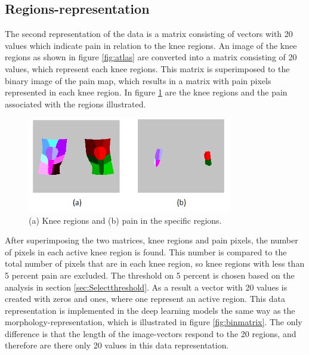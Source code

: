 \subsection{Regions-representation}
The second representation of the data is a matrix consisting of vectors with 20 values which indicate pain in relation to the knee regions.
An image of the knee regions as shown in figure \ref{fig:atlas} are converted into a matrix consisting of 20 values, which represent each knee regions. This matrix is superimposed to the binary image of the pain map, which results in a matrix with pain pixels represented in each knee region. In figure \ref{fig:binregions} are the knee regions and the pain associated with the regions illustrated.

\begin{figure} [H]
\centering
\includegraphics[width=0.8\textwidth]{figures/binregions}
\caption{(a) Knee regions and (b) pain in the specific regions.}
\label{fig:binregions}
\end{figure}

\noindent
After superimposing the two matrices, knee regions and pain pixels, the number of pixels in each active knee region is found. This number is compared to the total number of pixels that are in each knee region, so knee regions with less than 5 percent pain are excluded. The threshold on 5 percent is chosen based on the analysis in section \ref{sec:Selectthreshold}. As a result a vector with 20 values is created with zeros and ones, where one represent an active region. This data representation is implemented in the deep learning models the same way as the morphology-representation, which is illustrated in figure \ref{fig:binmatrix}. The only difference is that the length of the image-vectors respond to the 20 regions, and therefore are there only 20 values in this data representation.


